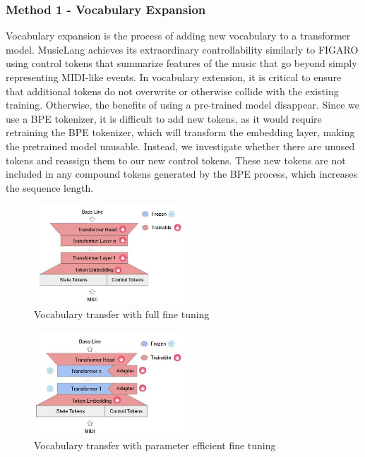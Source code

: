 \subsubsection{Method 1 - Vocabulary Expansion}

Vocabulary expansion is the process of adding new vocabulary to a transformer model. MusicLang achieves its extraordinary controllability similarly to FIGARO \cite{Rütte_figaro_2023} using control tokens that summarize features of the music that go beyond simply representing MIDI-like events. In vocabulary extension, it is critical to ensure that additional tokens do not overwrite or otherwise collide with the existing training. Otherwise, the benefits of using a pre-trained model disappear. Since we use a BPE tokenizer, it is difficult to add new tokens, as it would require retraining the BPE tokenizer, which will transform the embedding layer, making the pretrained model unusable. Instead, we investigate whether there are unused tokens and reassign them to our new control tokens. These new tokens are not included in any compound tokens generated by the BPE process, which increases the sequence length.

\begin{figure}[H]
    \centering
    \includegraphics[width=0.5\textwidth]{IMAGES/full_ft.jpg}
    \caption{Vocabulary transfer with full fine tuning}
    \label{fig:vocabtrans1}
\end{figure}

\begin{figure}[H]
    \centering
    \includegraphics[width=0.5\textwidth]{IMAGES/vocab_lora_ft.jpg} 
    \caption{Vocabulary transfer with parameter efficient fine tuning}
    \label{fig:vocabtrans2}
\end{figure}

